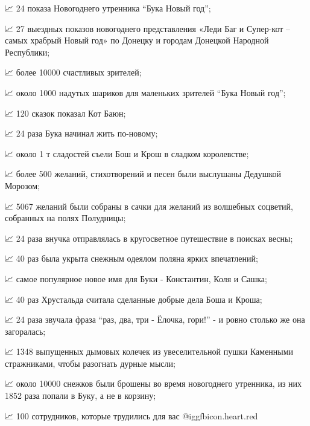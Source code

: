 📈 24 показа Новогоднего утренника \enquote{Бука Новый год};

📈 27 выездных показов новогоднего представления «Леди Баг и Супер-кот – самых
храбрый Новый год» по Донецку и городам Донецкой Народной Республики;

📈 более 10000 счастливых зрителей;

📈 около 1000 надутых шариков для маленьких зрителей \enquote{Бука Новый год};

📈 120 сказок показал Кот Баюн;

📈 24 раза Бука начинал жить по-новому;

📈 около 1 т сладостей съели Бош и Крош в сладком королевстве;

📈 более 500 желаний, стихотворений и песен были выслушаны Дедушкой Морозом;

📈 5067 желаний были собраны в сачки для желаний из волшебных соцветий,
собранных на полях Полудницы;

📈 24 раза внучка отправлялась в кругосветное путешествие в поисках весны;

📈 40 раз была укрыта снежным одеялом поляна ярких впечатлений;

📈 самое популярное новое имя для Буки - Константин, Коля и Сашка;

📈 40 раз Хрустальда считала сделанные добрые дела Боша и Кроша;

📈 24 раза звучала фраза \enquote{раз, два, три - Ёлочка, гори!} - и ровно столько же
она загоралась;

📈 1348 выпущенных дымовых колечек из увеселительной пушки Каменными
стражниками, чтобы разогнать дурные мысли;

📈 около 10000 снежков были брошены во время новогоднего утренника, из них 1852
раза попали в Буку, а не в корзину;

📈 100 сотрудников, которые трудились для вас @igg{fbicon.heart.red}
